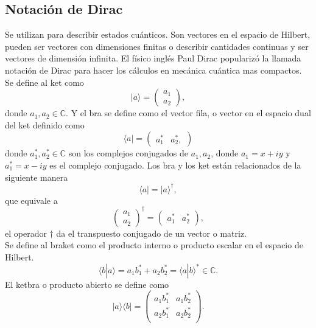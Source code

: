 \documentclass[a4paper]{article}
\begin{document}
\subsection{Notación de Dirac}
Se utilizan para describir estados cuánticos. Son vectores en el espacio de Hilbert, pueden ser vectores con dimensiones finitas o describir cantidades continuas y ser vectores de dimensión infinita. El físico inglés Paul Dirac popularizó la llamada notación de Dirac para hacer los cálculos en mecánica cuántica mas compactos.
Se define al ket como
\begin{equation}
|a\rangle=
	\begin{pmatrix}
		a_1\\
		a_2
	\end{pmatrix},
\end{equation}
donde $a_1, a_2 \in \mathbb{C} $. Y el bra se define como el vector fila, o vector en el espacio dual del ket definido como 
\begin{equation}
\langle a|=
	\begin{pmatrix}
		a_1^*&a_2^* ,
	\end{pmatrix}
\end{equation}
donde $a_1^*, a_2^* \in \mathbb{C} $ son los complejos conjugados de $a_1, a_2$, donde $a_1=x+iy$ y $a_1^*=x-iy$ es el complejo conjugado.
Los bra y los ket están relacionados de la siguiente manera
\begin{equation}
\langle a|=|a\rangle^\dagger ,
\end{equation}
que equivale a 
\begin{equation}
\begin{pmatrix}
		a_1\\
		a_2
	\end{pmatrix}^\dagger=
	\begin{pmatrix}
		a_1^*&a_2^*
	\end{pmatrix},
\end{equation}
el operador $\dagger$ da el transpuesto conjugado de un vector o matriz.\\
Se define al braket como el producto interno o producto escalar en el espacio de Hilbert.
\begin{equation}
\langle b | a\rangle=a_1b_1^*+a_2b_2^*=\langle a | b\rangle^*\in \mathbb{C} .
\end{equation}
El ketbra o producto abierto se define como 
\begin{equation}
|a\rangle\langle b|=
	\begin{pmatrix}
		a_1 b_1^*& a_1 b_2^*\\
		a_2 b_1^*& a_2 b_2^*\\
	\end{pmatrix}.
\end{equation}
\end{document}
